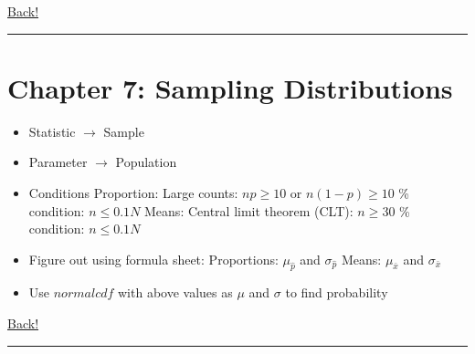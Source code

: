 \documentclass[main]{subfiles}
\begin{document}
\noindent\hyperlink{toc}{Back!}
\newline\hrule

\section{Chapter 7: Sampling Distributions}
\begin{itemize}
    \item Statistic $\rightarrow$ Sample
    \item Parameter $\rightarrow$ Population
    \item Conditions
        \subitem Proportion: 
            \subsubitem Large counts: $np \geq 10$ or $n(1 - p) \geq 10$
            \% condition: $n \leq 0.1N$
        \subitem Means: 
            \subsubitem Central limit theorem (CLT): $n \geq 30$
            \% condition: $n \leq 0.1N$
    \item Figure out using formula sheet:
        \subitem Proportions: $\mu_{\hat{p}}$ and $\sigma_{\hat{p}}$
        \subitem Means: $\mu_{\bar{x}}$ and $\sigma_{\bar{x}}$
    \item Use $normalcdf$ with above values as $\mu$ and $\sigma$ to find probability
\end{itemize}

\noindent\hyperlink{toc}{Back!}
\newline\hrule
\end{document}
